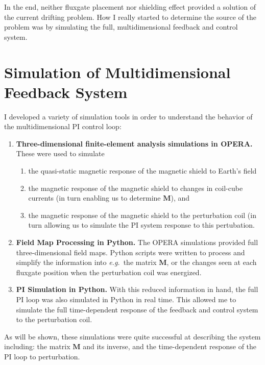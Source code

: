 

In the end, neither fluxgate placement nor shielding effect provided a
solution of the current drifting problem.  How I really started to
determine the source of the problem was by simulating the full,
multidimensional feedback and control system.

\section{Simulation of Multidimensional Feedback System}\label{sec:pSim}

I developed a variety of simulation tools in order to understand the
behavior of the multidimensional PI control loop:
\begin{enumerate}
\item {\bf Three-dimensional finite-element analysis simulations in OPERA.}  These were used to simulate
\begin{enumerate}
\item the quasi-static magnetic response of the magnetic shield to Earth's field
\item the magnetic response of the magnetic shield to changes in coil-cube currents (in turn enabling us to determine $\mathbf{M}$), and
\item the magnetic response of the magnetic shield to the perturbation coil (in turn allowing us to simulate the PI system response to this pertubation.
\end{enumerate}
\item {\bf Field Map Processing in Python.}  The OPERA simulations provided full three-dimensional field maps.  Python scripts were written to process and simplify the information into {\it e.g.}~the matrix $\mathbf{M}$, or the changes seen at each fluxgate position when the perturbation coil was energized.
\item {\bf PI Simulation in Python.}  With this reduced information in hand, the full PI loop was also simulated in Python in real time.  This allowed me to simulate the full time-dependent response of the feedback and control system to the perturbation coil.
\end{enumerate}
As will be shown, these simulations were quite successful at
describing the system including: the matrix $\mathbf{M}$ and its
inverse, and the time-dependent response of the PI loop to
perturbation.

